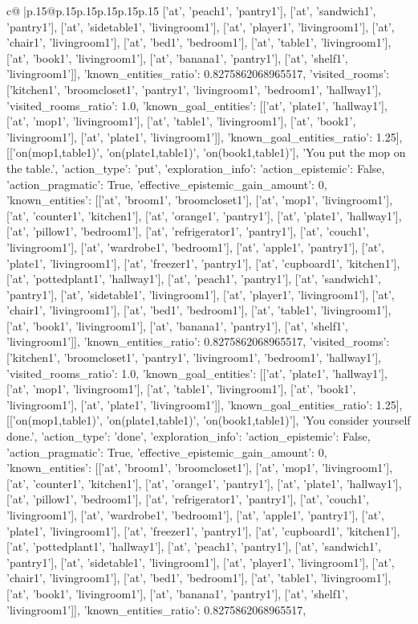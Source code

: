 \documentclass{article}
\begin{document}
{\begin{supertabular}{c@{$\;$}|p{.15\linewidth}@{}p{.15\linewidth}p{.15\linewidth}p{.15\linewidth}p{.15\linewidth}p{.15\linewidth}}
{{{['at', 'peach1', 'pantry1'], ['at', 'sandwich1', 'pantry1'], ['at', 'sidetable1', 'livingroom1'], ['at', 'player1', 'livingroom1'], ['at', 'chair1', 'livingroom1'], ['at', 'bed1', 'bedroom1'], ['at', 'table1', 'livingroom1'], ['at', 'book1', 'livingroom1'], ['at', 'banana1', 'pantry1'], ['at', 'shelf1', 'livingroom1']], 'known_entities_ratio': 0.8275862068965517, 'visited_rooms': ['kitchen1', 'broomcloset1', 'pantry1', 'livingroom1', 'bedroom1', 'hallway1'], 'visited_rooms_ratio': 1.0, 'known_goal_entities': [['at', 'plate1', 'hallway1'], ['at', 'mop1', 'livingroom1'], ['at', 'table1', 'livingroom1'], ['at', 'book1', 'livingroom1'], ['at', 'plate1', 'livingroom1']], 'known_goal_entities_ratio': 1.25}}], [['on(mop1,table1)', 'on(plate1,table1)', 'on(book1,table1)'], 'You put the mop on the table.\n', {'action_type': 'put', 'exploration_info': {'action_epistemic': False, 'action_pragmatic': True, 'effective_epistemic_gain_amount': 0, 'known_entities': [['at', 'broom1', 'broomcloset1'], ['at', 'mop1', 'livingroom1'], ['at', 'counter1', 'kitchen1'], ['at', 'orange1', 'pantry1'], ['at', 'plate1', 'hallway1'], ['at', 'pillow1', 'bedroom1'], ['at', 'refrigerator1', 'pantry1'], ['at', 'couch1', 'livingroom1'], ['at', 'wardrobe1', 'bedroom1'], ['at', 'apple1', 'pantry1'], ['at', 'plate1', 'livingroom1'], ['at', 'freezer1', 'pantry1'], ['at', 'cupboard1', 'kitchen1'], ['at', 'pottedplant1', 'hallway1'], ['at', 'peach1', 'pantry1'], ['at', 'sandwich1', 'pantry1'], ['at', 'sidetable1', 'livingroom1'], ['at', 'player1', 'livingroom1'], ['at', 'chair1', 'livingroom1'], ['at', 'bed1', 'bedroom1'], ['at', 'table1', 'livingroom1'], ['at', 'book1', 'livingroom1'], ['at', 'banana1', 'pantry1'], ['at', 'shelf1', 'livingroom1']], 'known_entities_ratio': 0.8275862068965517, 'visited_rooms': ['kitchen1', 'broomcloset1', 'pantry1', 'livingroom1', 'bedroom1', 'hallway1'], 'visited_rooms_ratio': 1.0, 'known_goal_entities': [['at', 'plate1', 'hallway1'], ['at', 'mop1', 'livingroom1'], ['at', 'table1', 'livingroom1'], ['at', 'book1', 'livingroom1'], ['at', 'plate1', 'livingroom1']], 'known_goal_entities_ratio': 1.25}}], [['on(mop1,table1)', 'on(plate1,table1)', 'on(book1,table1)'], 'You consider yourself done.\n', {'action_type': 'done', 'exploration_info': {'action_epistemic': False, 'action_pragmatic': True, 'effective_epistemic_gain_amount': 0, 'known_entities': [['at', 'broom1', 'broomcloset1'], ['at', 'mop1', 'livingroom1'], ['at', 'counter1', 'kitchen1'], ['at', 'orange1', 'pantry1'], ['at', 'plate1', 'hallway1'], ['at', 'pillow1', 'bedroom1'], ['at', 'refrigerator1', 'pantry1'], ['at', 'couch1', 'livingroom1'], ['at', 'wardrobe1', 'bedroom1'], ['at', 'apple1', 'pantry1'], ['at', 'plate1', 'livingroom1'], ['at', 'freezer1', 'pantry1'], ['at', 'cupboard1', 'kitchen1'], ['at', 'pottedplant1', 'hallway1'], ['at', 'peach1', 'pantry1'], ['at', 'sandwich1', 'pantry1'], ['at', 'sidetable1', 'livingroom1'], ['at', 'player1', 'livingroom1'], ['at', 'chair1', 'livingroom1'], ['at', 'bed1', 'bedroom1'], ['at', 'table1', 'livingroom1'], ['at', 'book1', 'livingroom1'], ['at', 'banana1', 'pantry1'], ['at', 'shelf1', 'livingroom1']], 'known_entities_ratio': 0.8275862068965517, }}}
\end{supertabular}}
\end{document}
